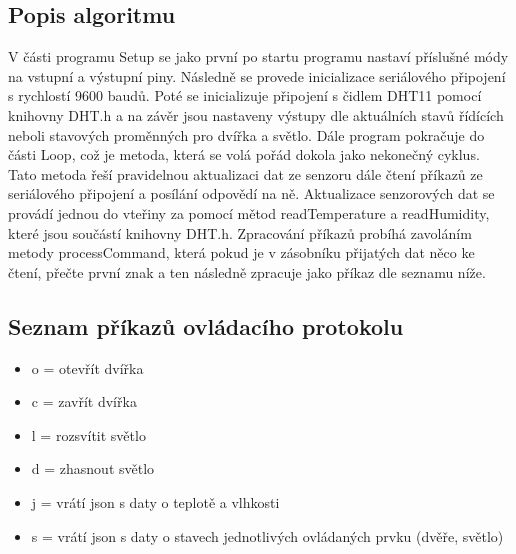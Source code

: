 \subsection*{Popis algoritmu}
V části programu Setup se jako první po startu programu nastaví příslušné módy na vstupní a výstupní piny.
Následně se provede inicializace seriálového připojení s rychlostí 9600 baudů.
Poté se inicializuje připojení s čidlem DHT11 pomocí knihovny DHT.h a na závěr jsou nastaveny výstupy dle aktuálních stavů řídících neboli stavových proměnných pro dvířka a světlo.
Dále program pokračuje do části Loop, což je metoda, která se volá pořád dokola jako nekonečný cyklus.
Tato metoda řeší pravidelnou aktualizaci dat ze senzoru dále čtení příkazů ze seriálového připojení a posílání odpovědí na ně.
Aktualizace senzorových dat se provádí jednou do vteřiny za pomocí mětod readTemperature a readHumidity, které jsou součástí knihovny DHT.h.
Zpracování příkazů probíhá zavoláním metody processCommand, která pokud je v zásobníku přijatých dat něco ke čtení, přečte první znak a ten následně zpracuje jako příkaz dle seznamu níže.

\subsection*{Seznam příkazů ovládacího protokolu}
\begin{itemize}
    \item o = otevřít dvířka
    \item c = zavřít dvířka
    \item l = rozsvítit světlo
    \item d = zhasnout světlo
    \item j = vrátí json s daty o teplotě a vlhkosti
    \item s = vrátí json s daty o stavech jednotlivých ovládaných prvku (dvěře, světlo)
\end{itemize}

%
%
%
%